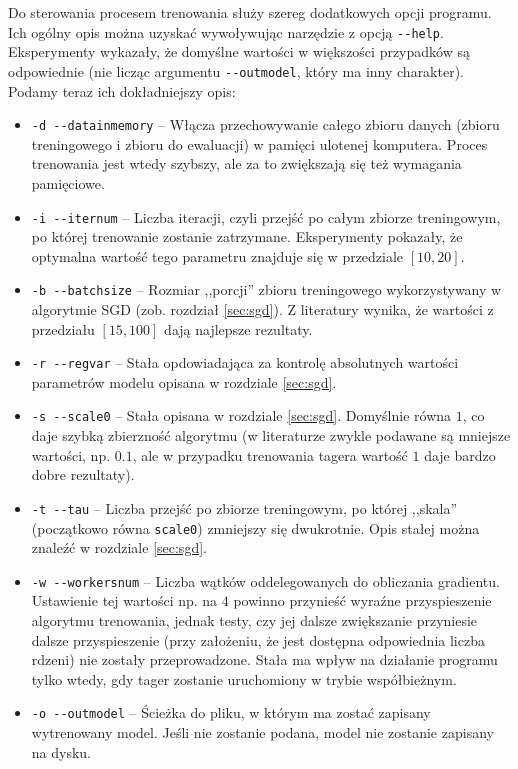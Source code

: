 \documentclass[a4paper,10]{article}
\begin{document}
Do sterowania procesem trenowania służy szereg dodatkowych opcji programu.
Ich ogólny opis można uzyskać wywoływując narzędzie z opcją \verb|--help|.
Eksperymenty wykazały, że domyślne wartości w większości przypadków
są odpowiednie (nie licząc argumentu \verb|--outmodel|, który ma inny
charakter). Podamy teraz ich dokładniejszy opis:
\begin{itemize}
\item \verb|-d --datainmemory| -- Włącza przechowywanie całego zbioru danych
  (zbioru treningowego i zbioru do ewaluacji) w pamięci ulotenej komputera.
  Proces trenowania jest wtedy szybszy, ale za to zwiększają się też
  wymagania pamięciowe.
\item \verb|-i --iternum| -- Liczba iteracji, czyli przejść po całym zbiorze
  treningowym, po której trenowanie zostanie zatrzymane.
  Eksperymenty pokazały, że optymalna wartość tego parametru
  znajduje się w przedziale $[10, 20]$.
\item \verb|-b --batchsize| -- Rozmiar ,,porcji'' zbioru treningowego
  wykorzystywany w algorytmie SGD (zob. rozdział \ref{sec:sgd}).
  Z literatury wynika, że wartości z przedziału $[15, 100]$ dają
  najlepsze rezultaty.
\item \verb|-r --regvar| -- Stała opdowiadająca za kontrolę absolutnych wartości
  parametrów modelu opisana w rozdziale \ref{sec:sgd}.
\item \verb|-s --scale0| -- Stała opisana w rozdziale \ref{sec:sgd}.
  Domyślnie równa $1$, co daje szybką zbierzność algorytmu (w literaturze
  zwykle podawane są mniejsze wartości, np. $0.1$, ale w przypadku trenowania
  tagera wartość $1$ daje bardzo dobre rezultaty).
\item \verb|-t --tau| -- Liczba przejść po zbiorze treningowym, po której
  ,,skala'' (początkowo równa \verb|scale0|) zmniejszy się dwukrotnie.
  Opis stałej można znaleźć w rozdziale \ref{sec:sgd}.
\item \verb|-w --workersnum| -- Liczba wątków oddelegowanych do obliczania
  gradientu. Ustawienie tej wartości np. na $4$ powinno przynieść wyraźne
  przyspieszenie algorytmu trenowania, jednak testy, czy jej dalsze zwiększanie
  przyniesie dalsze przyspieszenie (przy założeniu, że jest dostępna
  odpowiednia liczba rdzeni) nie zostały przeprowadzone.
  Stała ma wpływ na działanie programu tylko wtedy, gdy tager zostanie
  uruchomiony w trybie współbieżnym.
\item \verb|-o --outmodel| -- Ścieżka do pliku, w którym ma zostać
  zapisany wytrenowany model. Jeśli nie zostanie podana, model nie zostanie
  zapisany na dysku.
\end{itemize}
\end{document}
